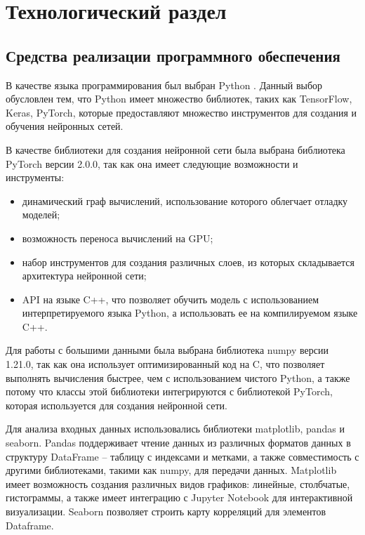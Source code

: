\chapter{Технологический раздел}

\section{Средства реализации программного обеспечения}

В качестве языка программирования был выбран Python \cite{Python}. Данный выбор обусловлен тем, что Python имеет множество библиотек, таких как TensorFlow, Keras, PyTorch, которые предоставляют множество инструментов для создания и обучения нейронных сетей.

В качестве библиотеки для создания нейронной сети была выбрана библиотека PyTorch \cite{PyTorch} версии 2.0.0, так как она имеет следующие возможности и инструменты:
\begin{itemize}
	\item динамический граф вычислений, использование которого облегчает отладку моделей;
	\item возможность переноса вычислений на GPU;
	\item набор инструментов для создания различных слоев, из которых складывается архитектура нейронной сети;
	\item API на языке C++, что позволяет обучить модель с использованием интерпретируемого языка Python, а использовать ее на компилируемом языке C++.
\end{itemize}

Для работы с большими данными была выбрана библиотека numpy версии 1.21.0, так как она использует оптимизированный код на C, что позволяет выполнять вычисления быстрее, чем с использованием чистого Python, а также потому что классы этой библиотеки интегрируются с библиотекой PyTorch, которая используется для создания нейронной сети.

Для анализа входных данных использовались библиотеки matplotlib, pandas и seaborn.
Pandas поддерживает чтение данных из различных форматов данных в структуру DataFrame -- таблицу с индексами и метками, а также совместимость с другими библиотеками, такими как numpy, для передачи данных.
Matplotlib имеет возможность создания различных видов графиков: линейные, столбчатые, гистограммы, а также имеет интеграцию с Jupyter Notebook для интерактивной визуализации.
Seaborn позволяет строить карту корреляций для элементов Dataframe.

